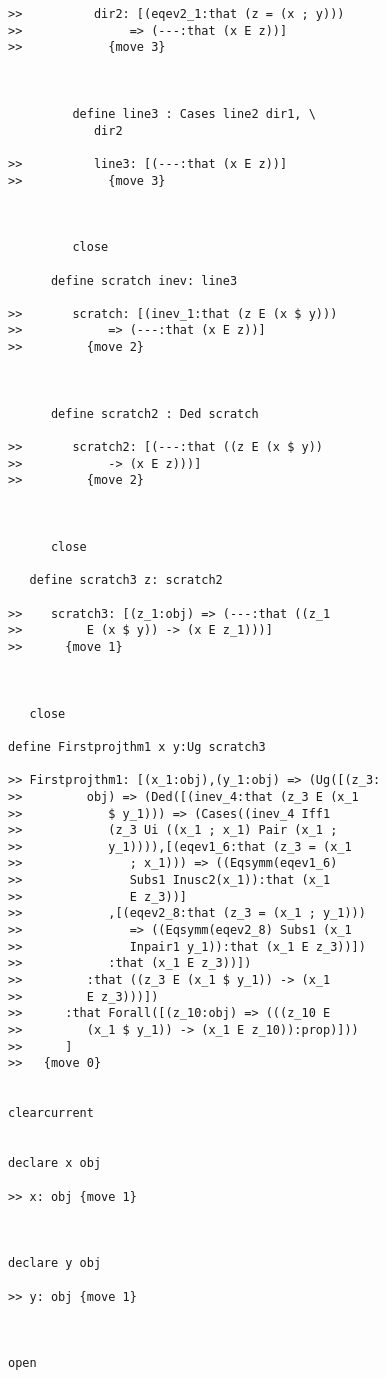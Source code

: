 \documentclass[12pt]{article}
\begin{document}
\begin{verbatim}
>>          dir2: [(eqev2_1:that (z = (x ; y)))
>>               => (---:that (x E z))]
>>            {move 3}



         define line3 : Cases line2 dir1, \
            dir2

>>          line3: [(---:that (x E z))]
>>            {move 3}



         close

      define scratch inev: line3

>>       scratch: [(inev_1:that (z E (x $ y)))
>>            => (---:that (x E z))]
>>         {move 2}



      define scratch2 : Ded scratch

>>       scratch2: [(---:that ((z E (x $ y))
>>            -> (x E z)))]
>>         {move 2}



      close

   define scratch3 z: scratch2

>>    scratch3: [(z_1:obj) => (---:that ((z_1
>>         E (x $ y)) -> (x E z_1)))]
>>      {move 1}



   close

define Firstprojthm1 x y:Ug scratch3

>> Firstprojthm1: [(x_1:obj),(y_1:obj) => (Ug([(z_3:
>>         obj) => (Ded([(inev_4:that (z_3 E (x_1
>>            $ y_1))) => (Cases((inev_4 Iff1
>>            (z_3 Ui ((x_1 ; x_1) Pair (x_1 ;
>>            y_1)))),[(eqev1_6:that (z_3 = (x_1
>>               ; x_1))) => ((Eqsymm(eqev1_6)
>>               Subs1 Inusc2(x_1)):that (x_1
>>               E z_3))]
>>            ,[(eqev2_8:that (z_3 = (x_1 ; y_1)))
>>               => ((Eqsymm(eqev2_8) Subs1 (x_1
>>               Inpair1 y_1)):that (x_1 E z_3))])
>>            :that (x_1 E z_3))])
>>         :that ((z_3 E (x_1 $ y_1)) -> (x_1
>>         E z_3)))])
>>      :that Forall([(z_10:obj) => (((z_10 E
>>         (x_1 $ y_1)) -> (x_1 E z_10)):prop)]))
>>      ]
>>   {move 0}


clearcurrent


declare x obj

>> x: obj {move 1}



declare y obj

>> y: obj {move 1}



open


\end{verbatim}
\end{document}
